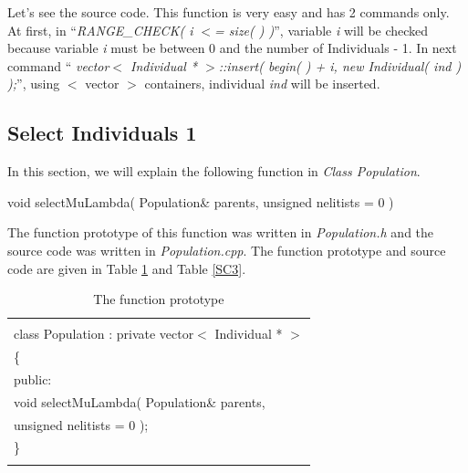 \documentclass[twocolumn]{article}
\begin{document}
\noindent
Let's see the source code. This function is very easy and has 2
commands only. At first, in ``{\em RANGE\_CHECK( i $<$= size( ) )}'',
variable {\em i} will be checked because variable {\em i} must be
between 0 and the number of Individuals - 1. In next command ``{\em
vector$<$ Individual * $>$::insert( begin( ) + i, new Individual( ind
) );}'', using $<$ vector $>$ containers, individual {\em ind} will be
inserted.

\subsection{Select Individuals 1}

\noindent
In this section, we will explain the following function in {\em Class
Population}. 

\begin{center}
void selectMuLambda( Population\& parents, unsigned nelitists = 0 )
\end{center}

\noindent
The function prototype of this function was written in {\em
Population.h} and the source code was written in {\em
Population.cpp}. The function prototype and source code are given in Table
\ref{FP3} and Table \ref{SC3}.

\begin{table}[h]
\begin{center}
\caption{The function prototype}
\label{FP3}
{\scriptsize
\begin{tabular}{|l|}\hline
\hspace*{7cm}\\
class Population : private vector$<$ Individual * $>$\\
\{\\
\hspace*{4mm} public:\\
\hspace*{8mm} void selectMuLambda( Population\& parents, \\
\hspace*{12mm} unsigned nelitists = 0 );\\
\}\\
\hspace*{7cm}\\\hline
\end{tabular}
}
\end{center} 
\end{table}
\end{document}
